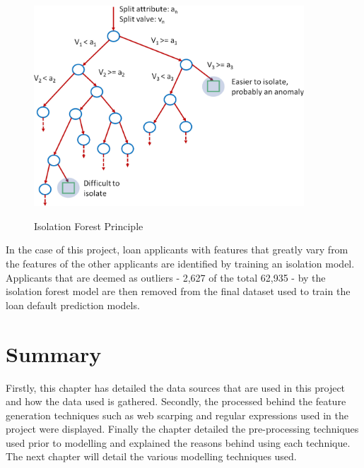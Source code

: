\vspace{10pt}

\begin{figure}[!htb]
\centering
\includegraphics[width=0.9\textwidth]{images/isolation_tree.jpg}
\caption{Isolation Forest Principle}
\label{fig:isolation}
\parencite{Outlier1}
\end{figure}

\vspace{10pt}

In the case of this project, loan applicants with features that greatly vary from the features of the other applicants are identified by training an isolation model. Applicants that are deemed as outliers - 2,627 of the total 62,935 - by the isolation forest model are then removed from the final dataset used to train the loan default prediction models. \\


\section{Summary}

Firstly, this chapter has detailed the data sources that are used in this project and how the data used is gathered. Secondly, the processed behind the feature generation techniques such as web scarping and regular expressions used in the project were displayed. Finally the chapter detailed the pre-processing techniques used prior to modelling and explained the reasons behind using each technique. The next chapter will detail the various modelling techniques used. 